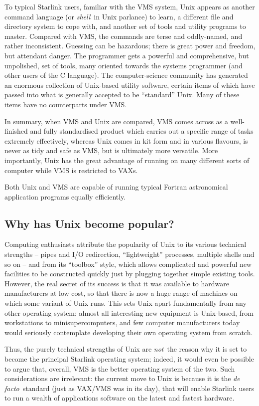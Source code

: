 To typical Starlink users, familiar with the VMS system, Unix appears as
another command language (or {\it shell}\, in Unix parlance) to learn, a
different file and directory system to cope with, and another set of
tools and utility programs to master.  Compared with VMS, the commands
are terse and oddly-named, and rather inconsistent.  Guessing can be
hazardous;  there is great power and freedom, but attendant danger.  The
programmer gets a powerful and comprehensive, but unpolished, set of
tools, many oriented towards the systems programmer (and other users
of the C language).  The computer-science community has generated an
enormous collection of Unix-based utility software, certain items of
which have passed into what is generally accepted to be ``standard''
Unix.  Many of these items have no counterparts under VMS.

In summary, when VMS and Unix are compared, VMS comes across as a
well-finished and fully standardised product which carries out a
specific range of tasks extremely effectively, whereas Unix comes in kit
form and in various flavours, is never as tidy and safe as VMS, but is
ultimately more versatile.  More importantly, Unix has the great
advantage of running on many different sorts of computer while VMS is
restricted to VAXs.

Both Unix and VMS are capable of running typical Fortran astronomical
application programs equally efficiently.

\subsection{Why has Unix become popular?}
Computing enthusiasts attribute the popularity of Unix to its various
technical strengths -- pipes and I/O redirection, ``lightweight''
processes, multiple shells and so on -- and from its ``toolbox'' style,
which allows complicated and powerful new facilities to be constructed
quickly just by plugging together simple existing tools.  However, the
real secret of its success is that it was available to hardware
manufacturers at low cost, so that there is now a huge range of machines
on which some variant of Unix runs.  This sets Unix apart fundamentally
from any other operating system:  almost all interesting new equipment
is Unix-based, from workstations to minisupercomputers, and few computer
manufacturers today would seriously contemplate developing their own
operating system from scratch.

Thus, the purely technical strengths of Unix are {\it not}\, the
reason why it is set to become the principal Starlink operating system;
indeed, it would even be possible to argue that, overall, VMS is the
better operating system of the two.  Such considerations are irrelevant:
the current move to Unix is because it is the {\it de facto}\, standard
(just as VAX/VMS was in its day), that will enable Starlink users to run
a wealth of applications software on the latest and fastest hardware.


